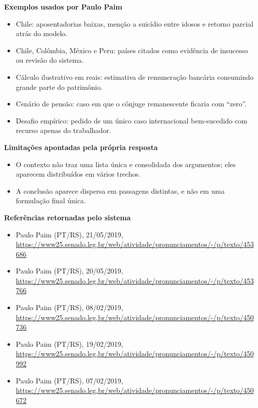 \textbf{Exemplos usados por Paulo Paim}

\begin{itemize}
  \item Chile: aposentadorias baixas, menção a suicídio entre idosos e retorno parcial atrás do modelo.
  \item Chile, Colômbia, México e Peru: países citados como evidência de insucesso ou revisão do sistema.
  \item Cálculo ilustrativo em reais: estimativa de remuneração bancária consumindo grande parte do patrimônio.
  \item Cenário de pensão: caso em que o cônjuge remanescente ficaria com ``zero''.
  \item Desafio empírico: pedido de um único caso internacional bem-sucedido com recurso apenas do trabalhador.
\end{itemize}

\textbf{Limitações apontadas pela própria resposta}

\begin{itemize}
  \item O contexto não traz uma lista única e consolidada dos argumentos; eles aparecem distribuídos em vários trechos.
  \item A conclusão aparece dispersa em passagens distintas, e não em uma formulação final única.
\end{itemize}

\textbf{Referências retornadas pelo sistema}

\begin{itemize}
  \item Paulo Paim (PT/RS), 21/05/2019, \url{https://www25.senado.leg.br/web/atividade/pronunciamentos/-/p/texto/453686}
  \item Paulo Paim (PT/RS), 20/05/2019, \url{https://www25.senado.leg.br/web/atividade/pronunciamentos/-/p/texto/453766}
  \item Paulo Paim (PT/RS), 08/02/2019, \url{https://www25.senado.leg.br/web/atividade/pronunciamentos/-/p/texto/450736}
  \item Paulo Paim (PT/RS), 19/02/2019, \url{https://www25.senado.leg.br/web/atividade/pronunciamentos/-/p/texto/450992}
  \item Paulo Paim (PT/RS), 07/02/2019, \url{https://www25.senado.leg.br/web/atividade/pronunciamentos/-/p/texto/450672}
\end{itemize}
